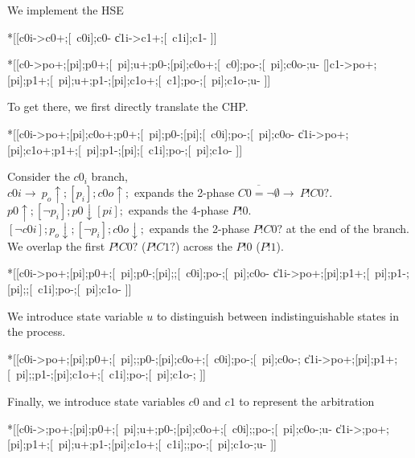 \documentclass{article}
\begin{document}
We implement the HSE

\begin{hse}
*[[c0i->c0+;[~c0i];c0-
  \|c1i->c1+;[~c1i];c1-
 ]]

*[[c0->po+;[pi];p0+;[~pi];u+;p0-;[pi];c0o+;[~c0];po-;[~pi];c0o-;u-
  []c1->po+;[pi];p1+;[~pi];u+;p1-;[pi];c1o+;[~c1];po-;[~pi];c1o-;u-
 ]]
\end{hse}

\noindent
To get there, we first directly translate the CHP.

\begin{hse}
*[[c0i->po+;[pi];c0o+;p0+;[~pi];p0-;[pi];[~c0i];po-;[~pi];c0o-
  \|c1i->po+;[pi];c1o+;p1+;[~pi];p1-;[pi];[~c1i];po-;[~pi];c1o-
 ]]
\end{hse}

\noindent
Consider the $c0_i$ branch, \\
$c0i\rightarrow\ p_o\uparrow;[p_i];c0o\uparrow;$ expands the 2-phase
$\overline{C0=\neg\emptyset}\rightarrow\ P!C0?$. \\
$p0\uparrow;[\neg p_i];p0\downarrow[pi];$ expands the 4-phase $P!0$. \\
$[\neg c0i];p_o\downarrow;[\neg p_i];c0o\downarrow;$ expands the 2-phase
$P!C0?$ at the end of the branch. \\

\noindent
We overlap the first $P!C0?$ ($P!C1?$) across the $P!0$ ($P!1$).

\begin{hse}
*[[c0i->po+;[pi];p0+;[~pi];p0-;[pi];;[~c0i];po-;[~pi];c0o-
  \|c1i->po+;[pi];p1+;[~pi];p1-;[pi];;[~c1i];po-;[~pi];c1o-
 ]]
\end{hse}

\noindent
We introduce state variable $u$ to distinguish between indistinguishable
states in the process.

\begin{hse}
*[[c0i->po+;[pi];p0+;[~pi];;p0-;[pi];c0o+;[~c0i];po-;[~pi];c0o-;
  \|c1i->po+;[pi];p1+;[~pi];;p1-;[pi];c1o+;[~c1i];po-;[~pi];c1o-;
 ]]
\end{hse}

\noindent
Finally, we introduce state variables $c0$ and $c1$ to represent the arbitration

\begin{hse}
*[[c0i->;po+;[pi];p0+;[~pi];u+;p0-;[pi];c0o+;[~c0i];;po-;[~pi];c0o-;u-
  \|c1i->;po+;[pi];p1+;[~pi];u+;p1-;[pi];c1o+;[~c1i];;po-;[~pi];c1o-;u-
 ]]
\end{hse}
\end{document}
